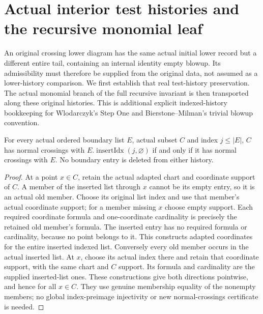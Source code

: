 \section{Actual interior test histories and the recursive monomial leaf}

An original crossing lower diagram has the same actual initial lower
record but a different entire tail, containing an internal identity empty
blowup.  Its admissibility must therefore be supplied from the original
data, not assumed as a lower-history comparison.  We first establish that
real test-history preservation.  The actual monomial branch of the full
recursive invariant is then transported along these original histories.
This is additional explicit indexed-history bookkeeping for Wlodarczyk's
Step One and Bierstone--Milman's trivial blowup convention.

\begin{lemma}
\label{hir:original-empty-boundary-centre-normal-crossings}
\leanok
{}
For every actual ordered boundary list $E$, actual subset $C$ and index
$j\leq |E|$, $C$ has normal crossings with
$E.\operatorname{insertIdx}(j,\varnothing)$ if and only if it has normal
crossings with $E$.  No boundary entry is deleted from either history.
\end{lemma}
\begin{proof}
At a point $x\in C$, retain the actual adapted chart and coordinate
support of $C$.  A member of the inserted list through $x$ cannot be its
empty entry, so it is an actual old member.  Choose its original list
index and use that member's actual coordinate support; for a member
missing $x$ choose empty support.  Each required coordinate formula and
one-coordinate cardinality is precisely the retained old member's
formula.  The inserted entry has no required formula or cardinality,
because no point belongs to it.  This constructs adapted coordinates for
the entire inserted indexed list.  Conversely every old member occurs
in the actual inserted list.  At $x$, choose its actual index there and
retain that coordinate support, with the same chart and $C$ support.
Its formula and cardinality are the supplied inserted-list ones.  These
constructions give both directions pointwise, and hence for all $x\in C$.
They use genuine membership equality of the nonempty members; no global
index-preimage injectivity or new normal-crossings certificate is needed.
\end{proof}

